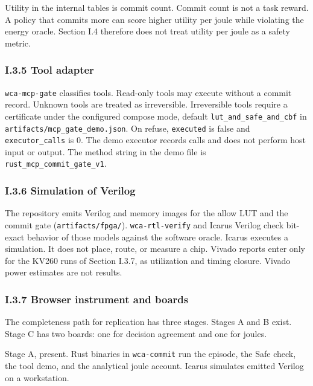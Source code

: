 \documentclass[
  10pt,
]{article}
\begin{document}
Utility in the internal tables is commit count. Commit count is not a
task reward. A policy that commits more can score higher utility per
joule while violating the energy oracle. Section I.4 therefore does not
treat utility per joule as a safety metric.

\subsubsection{I.3.5 Tool adapter}\label{i.3.5-tool-adapter}

\texttt{wca-mcp-gate} classifies tools. Read-only tools may execute
without a commit record. Unknown tools are treated as irreversible.
Irreversible tools require a certificate under the configured compose
mode, default \texttt{lut\_and\_safe\_and\_cbf} in
\texttt{artifacts/mcp\_gate\_demo.json}. On refuse, \texttt{executed} is
false and \texttt{executor\_calls} is 0. The demo executor records calls
and does not perform host input or output. The method string in the demo
file is \texttt{rust\_mcp\_commit\_gate\_v1}.

\subsubsection{I.3.6 Simulation of
Verilog}\label{i.3.6-simulation-of-verilog}

The repository emits Verilog and memory images for the allow LUT and the
commit gate (\texttt{artifacts/fpga/}). \texttt{wca-rtl-verify} and
Icarus Verilog check bit-exact behavior of those models against the
software oracle. Icarus executes a simulation. It does not place, route,
or measure a chip. Vivado reports enter only for the KV260 runs of
Section I.3.7, as utilization and timing closure. Vivado power estimates
are not results.

\subsubsection{I.3.7 Browser instrument and
boards}\label{i.3.7-browser-instrument-and-boards}

The completeness path for replication has three stages. Stages A and B
exist. Stage C has two boards: one for decision agreement and one for
joules.

Stage A, present. Rust binaries in \texttt{wca-commit} run the episode,
the Safe check, the tool demo, and the analytical joule account. Icarus
simulates emitted Verilog on a workstation.
\end{document}
